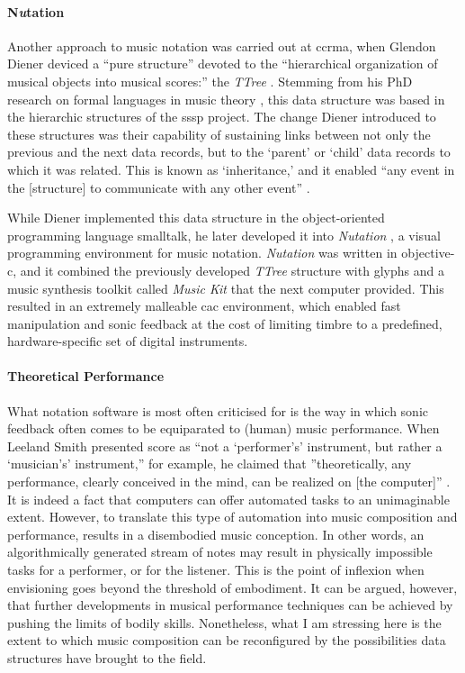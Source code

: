 	\paragraph{N\textit{u}tation}
	\label{computer:nutation}

	Another approach to music notation was carried out at \gls{ccrma}, when Glendon Diener \parencite{icmc/bbp2372.1988.020, 10.2307/3680043} deviced a ``pure structure'' devoted to the ``hierarchical organization of musical objects into musical scores:'' the \textit{TTree} \parencite[184]{icmc/bbp2372.1988.020}. Stemming from his PhD research on formal languages in music theory \parencite{diener1985}, this data structure was based in the hierarchic structures of the \gls{sssp} project. The change Diener introduced to these structures was their capability of sustaining links between not only the previous and the next data records, but to the `parent' or `child' data records to which it was related. This is known as `inheritance,' and it enabled ``any event in the [structure] to communicate with any other event'' \parencite[188]{icmc/bbp2372.1988.020}.

	While Diener implemented this data structure in the object-oriented programming language \gls{smalltalk}, he later developed it into \textit{Nutation} \parencite{DBLP:conf/icmc/Diener92}, a visual programming environment for music notation. \textit{Nutation} was written in \gls{objective-c}, and it combined the previously developed \textit{TTree} structure with glyphs and a music synthesis toolkit called \textit{Music Kit} that the \gls{next} computer provided. This resulted in an extremely malleable \gls{cac} environment, which enabled fast manipulation and sonic feedback at the cost of limiting timbre to a predefined, hardware-specific set of digital instruments. 

	\paragraph{Theoretical Performance}
	\label{computer:theoretical}

	What notation software is most often criticised for is the way in which sonic feedback often comes to be equiparated to (human) music performance. When Leeland Smith presented \gls{score} as ``not a `performer's' instrument, but rather a `musician's' instrument,'' for example, he claimed that ''theoretically, any performance, clearly conceived in the mind, can be realized on [the computer]'' \parencite[14]{smith1971}. It is indeed a fact that computers can offer automated tasks to an unimaginable extent. However, to translate this type of automation into music composition and performance, results in a disembodied music conception. In other words, an algorithmically generated stream of notes may result in physically impossible tasks for a performer, or for the listener. This is the point of inflexion when envisioning goes beyond the threshold of embodiment. It can be argued, however, that further developments in musical performance techniques can be achieved by pushing the limits of bodily skills. Nonetheless, what I am stressing here is the extent to which music composition can be reconfigured by the possibilities data structures have brought to the field.

